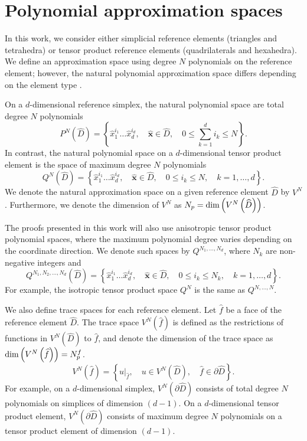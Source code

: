 \documentclass[review]{siamart0216}
\theoremstyle{assumption}
\renewcommand{\hat}[1]{\hat{#1}}
\newcommand{\LRp}[1]{\left( #1 \right)}
\newcommand{\LRc}[1]{\left\{ #1 \right\}}
\renewcommand{\hat}{\widehat}
\begin{document}
\section{Polynomial approximation spaces}

In this work, we consider either simplicial reference elements (triangles and tetrahedra) or tensor product reference elements (quadrilaterals and hexahedra).  We define an approximation space using degree $N$ polynomials on the reference element; however, the natural polynomial approximation space differs depending on the element type \cite{chan2015gpu}.  

On a $d$-dimensional reference simplex, the natural polynomial space are total degree $N$ polynomials 
\[
P^N\LRp{\hat{D}} = \LRc{\hat{x}_1^{i_1}\ldots\hat{x}_d^{i_d}, \quad \hat{\bm{x}} \in \hat{D}, \quad 0\leq \sum_{k=1}^d i_k \leq N}.
\]
In contrast, the natural polynomial space on a $d$-dimensional tensor product element is the space of maximum degree $N$ polynomials
\[
Q^N\LRp{\hat{D}} = \LRc{\hat{x}_1^{i_1}\ldots\hat{x}_d^{i_d}, \quad \hat{\bm{x}} \in \hat{D}, \quad 0\leq i_k \leq N, \quad k = 1,\ldots, d}.
\]
We denote the natural approximation space on a given reference element $\hat{D}$ by $V^N$.  Furthermore, we denote the dimension of $V^N$ as $N_p = {\rm dim}\LRp{V^N\LRp{\hat{D}}}$.  

The proofs presented in this work will also use anisotropic tensor product polynomial spaces, where the maximum polynomial degree varies depending on the coordinate direction.  We denote such spaces by $Q^{N_1, \ldots, N_d}$, where $N_k$ are non-negative integers and
\[
Q^{N_1, N_2, \ldots, N_d}\LRp{\hat{D}} = \LRc{\hat{x}_1^{i_1}\ldots\hat{x}_d^{i_d}, \quad \hat{\bm{x}} \in \hat{D}, \quad 0\leq i_k \leq N_k, \quad k = 1,\ldots, d}.
\]
For example, the isotropic tensor product space $Q^N$ is the same as $Q^{N,\ldots,N}$.

We also define trace spaces for each reference element.  Let $\hat{f}$ be a face of the reference element $\hat{D}$.  The trace space $V^N \LRp{\hat{f}}$ is defined as the restrictions of functions in $V^N\LRp{\hat{D}}$ to $\hat{f}$, and denote the dimension of the trace space as ${\rm dim}\LRp{V^N\LRp{{\hat{f}}}} = N^f_p$.  
\[
V^N \LRp{\hat{f}} = \LRc{ \left.u\right|_{\hat{f}}, \quad u \in V^N\LRp{\hat{D}}, \quad \hat{f}\in \partial\hat{D}}.
\]
For example, on a $d$-dimensional simplex, $V^N \LRp{\partial \hat{D}}$ consists of total degree $N$ polynomials on simplices of dimension $(d-1)$.  On a $d$-dimensional tensor product element, $V^N \LRp{\partial \hat{D}}$ consists of maximum degree $N$ polynomials on a tensor product element of dimension $(d-1)$.  
\end{document}
